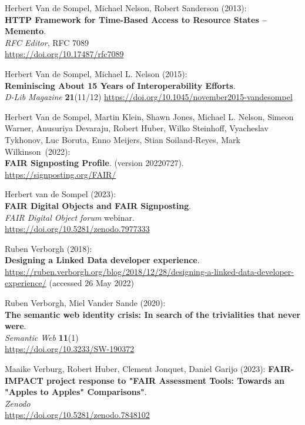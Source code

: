 \begin{thebibliography}{9}
Herbert Van de Sompel, Michael Nelson, Robert Sanderson (2013):\\
\textbf{{HTTP Framework} for {Time-Based Access} to {Resource States} --
{Memento}}.\\
\emph{RFC Editor}, RFC 7089\\
\url{https://doi.org/10.17487/rfc7089}

Herbert Van de Sompel, Michael L. Nelson (2015):\\
\textbf{Reminiscing About 15 Years of Interoperability Efforts}.\\
\emph{D-Lib Magazine} \textbf{21}(11/12)
\url{https://doi.org/10.1045/november2015-vandesompel}

Herbert Van de Sompel, Martin Klein, Shawn
Jones, Michael L. Nelson, Simeon Warner, Anusuriya Devaraju, Robert
Huber, Wilko Steinhoff, Vyacheslav Tykhonov, Luc Boruta, Enno Meijers,
Stian Soiland-Reyes, Mark Wilkinson~(2022):\\
\textbf{FAIR Signposting Profile}. (version 20220727).\\
\url{https://signposting.org/FAIR/}

Herbert van de Sompel (2023):\\
\textbf{FAIR Digital Objects and FAIR Signposting}.\\
\emph{FAIR Digital Object forum} webinar.\\
\url{https://doi.org/10.5281/zenodo.7977333}

Ruben Verborgh (2018): \\
\textbf{Designing a {Linked Data} developer experience}.\\
\url{https://ruben.verborgh.org/blog/2018/12/28/designing-a-linked-data-developer-experience/}
(accessed 26 May 2022)

Ruben Verborgh, Miel Vander Sande (2020): \\
\textbf{The semantic web identity crisis: In search of the trivialities that never were}.\\
\emph{Semantic Web} \textbf{11}(1)\\
\url{https://doi.org/10.3233/SW-190372}

Maaike Verburg, Robert Huber, Clement Jonquet, Daniel Garijo (2023):
\textbf{{FAIR-IMPACT project response to "FAIR Assessment Tools: Towards
an "Apples to Apples" Comparisons"}}.\\
\emph{Zenodo}\\
\url{https://doi.org/10.5281/zenodo.7848102}


\end{thebibliography}
